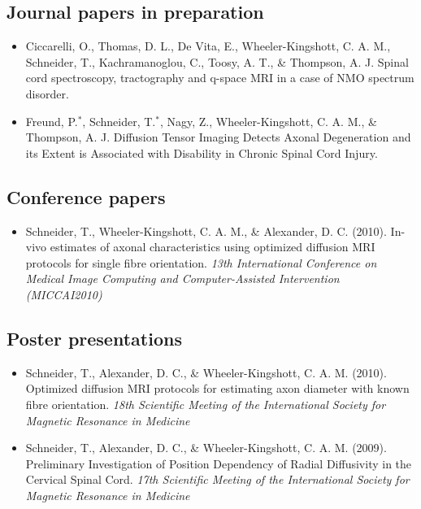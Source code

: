 \subsection*{Journal papers in preparation}
\begin{itemize}
  \item Ciccarelli, O., Thomas, D. L., De Vita, E., Wheeler-Kingshott, C. A. M., Schneider, T., Kachramanoglou, C., Toosy, A. T., \& Thompson, A. J. Spinal cord spectroscopy, tractography and q-space MRI in a case of NMO spectrum disorder.
  \item Freund, P.$^*$, Schneider, T.$^*$, Nagy, Z., Wheeler-Kingshott, C. A. M., \& Thompson, A. J. Diffusion Tensor Imaging Detects Axonal Degeneration and its Extent is Associated with Disability in Chronic Spinal Cord Injury.  
\end{itemize}
\subsection*{Conference papers}
\begin{itemize}
  \item Schneider, T., Wheeler-Kingshott, C. A. M., \& Alexander, D. C. (2010). In-vivo estimates of axonal characteristics using optimized diffusion MRI protocols for single fibre orientation. \emph{13th International Conference on Medical Image Computing and Computer-Assisted Intervention (MICCAI2010)}  
\end{itemize}
\subsection*{Poster presentations}
\begin{itemize}
  \item Schneider, T., Alexander, D. C., \& Wheeler-Kingshott, C. A. M. (2010). Optimized diffusion MRI protocols for estimating axon diameter with known fibre orientation. \emph{18th Scientific Meeting of the International Society for Magnetic Resonance in Medicine}
  \item Schneider, T., Alexander, D. C., \& Wheeler-Kingshott, C. A. M. (2009). Preliminary Investigation of Position Dependency of Radial Diffusivity in the Cervical Spinal Cord. \emph{17th Scientific Meeting of the International Society for Magnetic Resonance in Medicine}  
\end{itemize}

